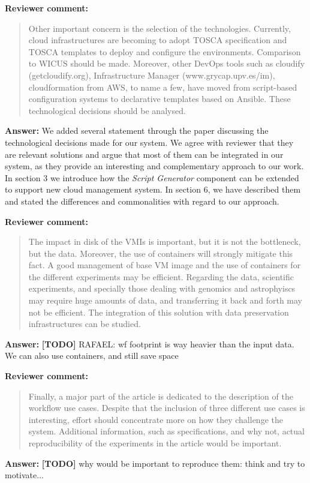 \documentclass{letter}
\newenvironment{review}%
{\textbf{Reviewer comment:}\begin{quote}}%
{\end{quote}}%
\newcommand{\todo}[1]{%
      \color{red}\textbf{[TODO]} #1\color{black}}
\newcommand{\answer}[1]{%
      \textbf{Answer:} #1}
\newcommand{\revised}[1]{\emph{#1}\color{black}}
\begin{document}
\begin{letter}{}



\revised{}


\begin{review}
Other important concern is the selection of the technologies. Currently, cloud infrastructures are becoming to adopt TOSCA specification and TOSCA templates to deploy and configure the environments. Comparison to WICUS should be made. Moreover, other DevOps tools such as cloudify (getcloudify.org), Infrastructure Manager (www.grycap.upv.es/im), cloudformation from AWS, to name a few, have moved from script-based configuration systems to declarative templates based on Ansible. These technological decisions should be analysed.
\end{review}

\answer{We added several statement through the paper discussing the technological decisions made for our system. We agree with reviewer that they are relevant solutions and argue that most of them can be integrated in our system, as they provide an interesting and complementary approach to our work. In section 3 we introduce how the {\it Script Generator} component can be extended to support new cloud management system. In section 6, we have described them and stated the differences and commonalities with regard to our approach.}



\begin{review}
The impact in disk of the VMIs is important, but it is not the bottleneck, but the data. Moreover, the use of containers will strongly mitigate this fact. A good management of base VM image and the use of containers for the different experiments may be efficient. Regarding the data, scientific experiments, and specially those dealing with genomics and astrophyiscs may require huge amounts of data, and transferring it back and forth may not be efficient. The integration of this solution with data preservation infrastructures can be studied.
\end{review}

\answer{\todo{RAFAEL: wf footprint is way heavier than the input data. We can also use containers, and still save space}}


\begin{review}
Finally, a major part of the article is dedicated to the description of the workflow use cases. Despite that the inclusion of three different use cases is interesting, effort should concentrate more on how they challenge the system. Additional information, such as specifications, and why not, actual reproducibility of the experiments in the article would be important.
\end{review}

\answer{\todo{why would be important to reproduce them: think and try to motivate...}}


\end{letter}
\end{document}
